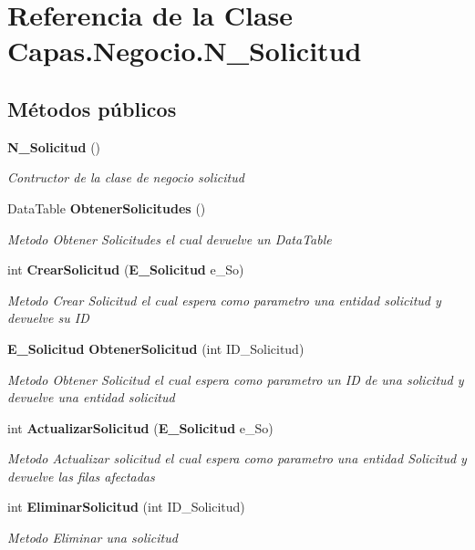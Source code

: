 \section{Referencia de la Clase Capas.\+Negocio.\+N\+\_\+\+Solicitud}
\label{class_capas_1_1_negocio_1_1_n___solicitud}
\subsection*{Métodos públicos}
\begin{DoxyCompactItemize}
\item 
{\bf N\+\_\+\+Solicitud} ()
\begin{DoxyCompactList}\small\item\em Contructor de la clase de negocio solicitud \end{DoxyCompactList}\item 
Data\+Table {\bf Obtener\+Solicitudes} ()
\begin{DoxyCompactList}\small\item\em Metodo Obtener Solicitudes el cual devuelve un Data\+Table \end{DoxyCompactList}\item 
int {\bf Crear\+Solicitud} ({\bf E\+\_\+\+Solicitud} e\+\_\+\+So)
\begin{DoxyCompactList}\small\item\em Metodo Crear Solicitud el cual espera como parametro una entidad solicitud y devuelve su ID \end{DoxyCompactList}\item 
{\bf E\+\_\+\+Solicitud} {\bf Obtener\+Solicitud} (int I\+D\+\_\+\+Solicitud)
\begin{DoxyCompactList}\small\item\em Metodo Obtener Solicitud el cual espera como parametro un ID de una solicitud y devuelve una entidad solicitud \end{DoxyCompactList}\item 
int {\bf Actualizar\+Solicitud} ({\bf E\+\_\+\+Solicitud} e\+\_\+\+So)
\begin{DoxyCompactList}\small\item\em Metodo Actualizar solicitud el cual espera como parametro una entidad Solicitud y devuelve las filas afectadas \end{DoxyCompactList}\item 
int {\bf Eliminar\+Solicitud} (int I\+D\+\_\+\+Solicitud)
\begin{DoxyCompactList}\small\item\em Metodo Eliminar una solicitud \end{DoxyCompactList}\item 

\end{DoxyCompactItemize}
